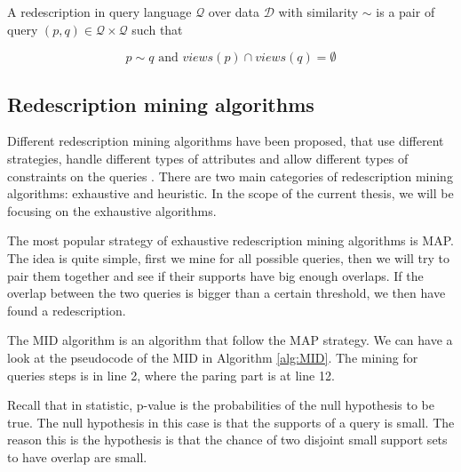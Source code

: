 \begin{definition}
    A redescription in query language $\mathcal{Q}$ over data $\mathcal{D}$ with similarity $\sim$ is a pair of query $(p, q) \in \mathcal{Q} \times \mathcal{Q}$ such that

    \begin{equation}
        p \sim q \text{ and } views(p) \cap views(q) = \emptyset
    \end{equation}
\end{definition}

\subsection{Redescription mining algorithms}
Different redescription mining algorithms have been proposed, that use different strategies, handle different types of attributes and allow different types of constraints on the queries \cite{galbrun2018redescription}.
There are two main categories of redescription mining algorithms: exhaustive and heuristic.
In the scope of the current thesis, we will be focusing on the exhaustive algorithms.

The most popular strategy of exhaustive redescription mining algorithms is \ac{MAP}.
The idea is quite simple, first we mine for all possible queries, then we will try to pair them together and see if their supports have big enough overlaps.
If the overlap between the two queries is bigger than a certain threshold, we then have found a redescription.

The \ac{MID} algorithm is an algorithm that follow the \ac{MAP} strategy.
We can have a look at the pseudocode of the \acl{MID} in Algorithm \ref{alg:MID}.
The mining for queries steps is in line 2, where the paring part is at line 12.

Recall that in statistic, p-value is the probabilities of the null hypothesis to be true.
The null hypothesis in this case is that the supports of a query is small.
The reason this is the hypothesis is that the chance of two disjoint small support sets to have overlap are small.

